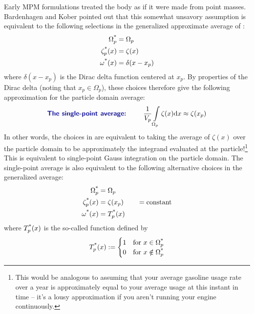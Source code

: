 Early MPM formulations treated the body as if it were made from point masses\cite{Sulsky1994}. Bardenhagen and Kober \cite{Bardenhagen2004} pointed out that this somewhat unsavory assumption is equivalent to the following selections in the generalized approximate average of  :
\begin{subequations}
\begin{align}
  \Omega_p^{\text{*}} &= \Omega_p
\\
  \zeta_p^{\text{*}}(x) &= \zeta(x)
\\
  \omega^{\text{*}}(x) &=\delta(x-x_p)
\end{align}
\label{eq:SulskyChoices}
\end{subequations}
where $\delta(x-x_p)$ is the Dirac delta function centered at $x_p$. By properties of the Dirac delta (noting that $x_p\in\Omega_p$), these choices therefore give the following approximation for the particle domain average:
\begin{equation}
\text{\Defn{The single-point average: }}\qquad
  \frac{1}{V_p}\int\limits_{\Omega_p} \zeta(x) \dd x
\approx
  \zeta(x_p)
\label{eq:SulskyAvg}
\end{equation}
In other words, the choices in  are equivalent to taking the average of $\zeta(x)$ over the particle domain to be approximately the integrand evaluated at the particle!\footnote{This would be analogous to assuming that your average gasoline usage rate over a year is approximately equal to your average usage at this instant in time -- it's a lousy approximation if you aren't running your engine continuously.} This is equivalent to single-point Gauss integration on the particle domain.  The single-point average is also equivalent to the following alternative choices in the generalized average:
\begin{subequations}
\begin{align}
  \Omega_p^{\text{*}} &= \Omega_p
\\
  \zeta_p^{\text{*}}(x) &= \zeta(x_p)\qquad=\text{constant}
\\
  \omega^{\text{*}}(x) &=T_p^{\text{*}}(x)
\end{align}
\label{eq:ConstantChoices}
\end{subequations}
where $T_p^{\text{*}}(x)$ is the so-called  function defined by
\begin{equation}
  T_p^{\text{*}}(x):=\begin{cases}1 & \text{for }x\in\Omega_p^{\text{*}} \\
                                0 & \text{for }x\notin\Omega_p^{\text{*}}
                   \end{cases}
\end{equation}

